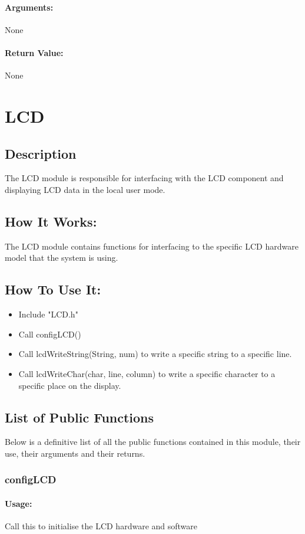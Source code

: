 \documentclass[]{report}
\begin{document}
\subsubsection{Arguments:}
None
\subsubsection{Return Value:}
None

\chapter{LCD}
\section{Description}
The LCD module is responsible for interfacing with the LCD component and displaying LCD data in the local user mode.

\section{How It Works:}
The LCD module contains functions for interfacing to the specific LCD hardware model that the system is using.

\section{How To Use It:}
\begin{itemize}
	\item Include "LCD.h"
	\item Call configLCD()
	\item Call lcdWriteString(String, num) to write a specific string to a specific line.
	\item Call lcdWriteChar(char, line, column) to write a specific character to a specific place on the display.
\end{itemize}

\section{List of Public Functions}
Below is a definitive list of all the public functions contained in this module, their use, their arguments and their returns.

\subsection{configLCD}
\subsubsection{Usage:}
Call this to initialise the LCD hardware and software
\end{document}
